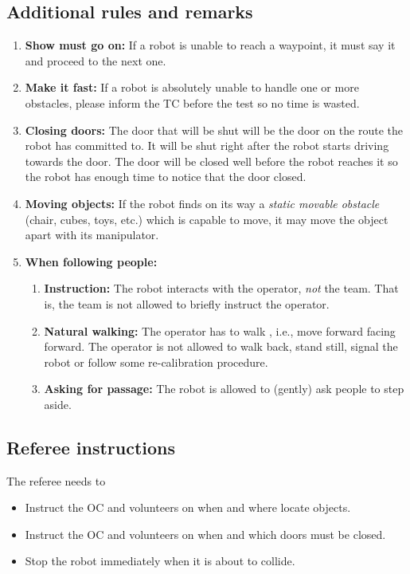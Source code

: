 \subsection{Additional rules and remarks}
\begin{enumerate}
	\item \textbf{Show must go on:} If a robot is unable to reach a waypoint, it must say it and proceed to the next one.
	\item \textbf{Make it fast:} If a robot is absolutely unable to handle one or more obstacles, please inform the TC before the test so no time is wasted.
	\item \textbf{Closing doors:}  The door that will be shut will be the door on the route the robot has committed to. It will be shut right after the robot starts driving towards the door. The door will be closed well before the robot reaches it so the robot has enough time to notice that the door closed.	
	\item \textbf{Moving objects:} If the robot finds on its way a \textit{static movable obstacle} (chair, cubes, toys, etc.) which is capable to move, it may move the object apart with its manipulator.
	\item \textbf{When following people:} 
	\begin{enumerate}
		\item \textbf{Instruction:} The robot interacts with the operator, \emph{not} the team. That is, the team is not allowed to briefly instruct the operator.
		\item \textbf{Natural walking:} The operator has to walk , i.e., move forward facing forward. The operator is not allowed to walk back, stand still, signal the robot or follow some re-calibration procedure.
		\item \textbf{Asking for passage:} The robot is allowed to (gently) ask people to step aside.
	\end{enumerate}
\end{enumerate}

\subsection{Referee instructions}

The referee needs to
\begin{itemize}
	\item Instruct the OC and volunteers on when and where locate objects.
	\item Instruct the OC and volunteers on when and which doors must be closed.
	\item Stop the robot immediately when it is about to collide.
\end{itemize}

